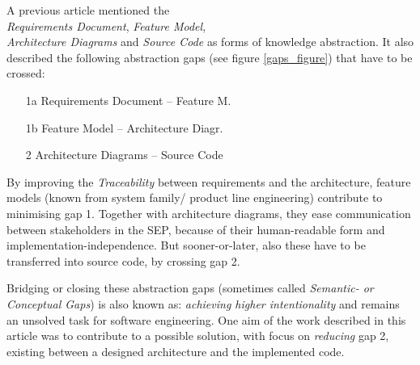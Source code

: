 A previous article \cite{heller2004} mentioned the\\ \emph{Requirements Document},
\emph{Feature Model},\\ \emph{Architecture Diagrams} and \emph{Source Code} as
forms of knowledge abstraction. It also described the following abstraction
gaps (see figure \ref{gaps_figure}) that have to be crossed:

\begin{enumerate}
    \item[1a] Requirements Document -- Feature M.
    \item[1b] Feature Model -- Architecture Diagr.
    \item[2] Architecture Diagrams -- Source Code
\end{enumerate}

By improving the \emph{Traceability} between requirements and the architecture,
feature models (known from system family/ product line engineering) contribute
to minimising gap 1. Together with architecture diagrams, they ease
communication between stakeholders in the SEP, because of their human-readable
form and implementation-independence. But sooner-or-later, also these have to
be transferred into source code, by crossing gap 2.

Bridging or closing these abstraction gaps (sometimes called \emph{Semantic- or
Conceptual Gaps}) is also known as: \textit{achieving higher intentionality}
and remains an unsolved task for software engineering. One aim of the work
described in this article was to contribute to a possible solution, with focus
on \emph{reducing} gap 2, existing between a designed architecture and the
implemented code.
